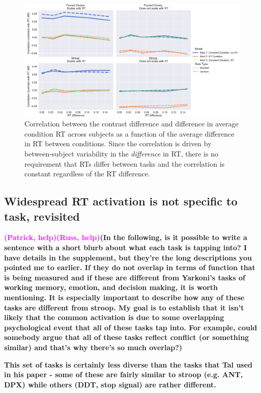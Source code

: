 \documentclass[titlepage,12pt] {article}
\newcommand{\rh}{\textcolor{magenta}{\textbf{(Russ, help)}}}
\newcommand{\ph}{\textcolor{magenta}{\textbf{(Patrick, help)}}}
\begin{document}
\begin{figure}
  \centering
   \includegraphics[width=5in]{Figures/cor_with_rt.pdf}
   \caption{Correlation between the contrast difference and difference in average condition RT across subjects as a function of the average difference in RT between conditions.  Since the correlation is driven by between-subject variability in the \emph{difference} in RT, there is no requirement that RTs differ between tasks and the correlation is constant regardless of the RT difference. }
  \label{fig:rt-cor}
\end{figure}




\subsection*{Widespread RT activation is not specific to task, revisited}

\ph\rh\textbf{(In the following, is it possible to write a sentence with a short blurb about what each task is tapping into?  I have details in the supplement, but they're the long descriptions you pointed me to earlier.  If they do not overlap in terms of function that is being measured and if these are different from Yarkoni's tasks of working memory, emotion, and decision making, it is worth mentioning.  It is especially important to describe how any of these tasks are different from stroop.  My goal is to establish that it isn't likely that the common activation is due to some overlapping psychological event that all of these tasks tap into.  For example, could somebody argue that all of these tasks reflect conflict (or something similar) and that's why there's so much overlap?)} 

\textbf{ This set of tasks is certainly less diverse than the tasks that Tal used in his paper - some of these are fairly similar to stroop (e.g. ANT, DPX) while others (DDT, stop signal) are rather different.}
\end{document}

